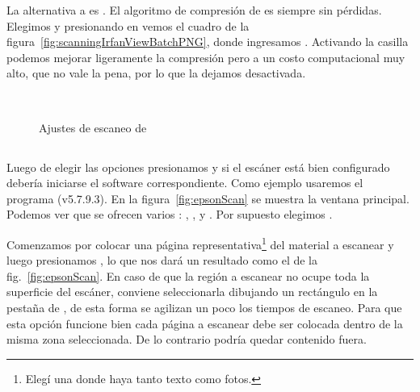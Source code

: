 \documentclass[%
	a5paper,
	10pt,
	twoside,
	openright,
	final,
]{memoir}
\begin{document}
{	La alternativa a \tiff es \png. El algoritmo de compresión de \png es siempre sin pérdidas. Elegimos  y presionando en   vemos el cuadro de la figura~\ref{fig:scanningIrfanViewBatchPNG}, donde ingresamos . Activando la casilla  podemos mejorar ligeramente la compresión pero a un costo computacional muy alto, que no vale la pena, por lo que la dejamos desactivada.

	\begin{figure}
		\centering
		\\
		\hfill
		\caption{Ajustes de escaneo de \irfanview\label{fig:scanningIrfanView}}
	\end{figure}

	\subsection{\epsonscan} Luego de elegir las opciones presionamos  y si el escáner está bien configurado debería iniciarse el software correspondiente. Como ejemplo usaremos el programa \epsonscan (v5.7.9.3). En la figura~\ref{fig:epsonScan} se muestra la ventana principal. Podemos ver que se ofrecen varios : , ,  y . Por supuesto elegimos .

	Comenzamos por colocar una página representativa\footnote{Elegí una donde haya tanto texto como fotos.} del material a escanear y luego presionamos , lo que nos dará un resultado como el de la fig.~\ref{fig:epsonScan}. En caso de que la región a escanear no ocupe toda la superficie del escáner, conviene seleccionarla dibujando un rectángulo en la pestaña de , de esta forma se agilizan un poco los tiempos de escaneo. \label{pag:scanningRegionSelection} Para que esta opción funcione bien cada página a escanear debe ser colocada dentro de la misma zona seleccionada. De lo contrario podría quedar contenido fuera.

}
\end{document}
